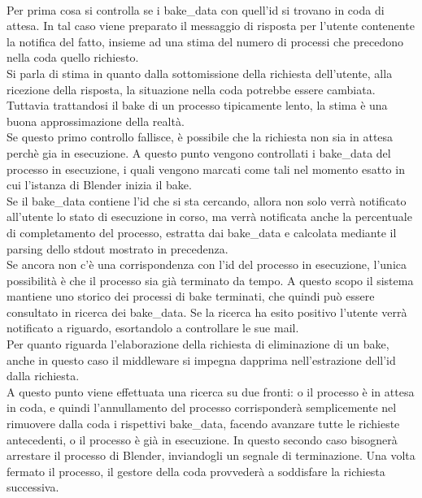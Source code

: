 \\
Per prima cosa si controlla se i bake\_data con quell’id si trovano in coda di attesa. In tal caso viene preparato il messaggio di risposta per l’utente contenente la notifica del fatto, insieme ad una stima del numero di processi che precedono nella coda quello richiesto. 
\\
Si parla di stima in quanto dalla sottomissione della richiesta dell’utente, alla ricezione della risposta, la situazione nella coda potrebbe essere cambiata. Tuttavia trattandosi il bake di un processo tipicamente lento, la stima è una buona approssimazione della realtà. 
\\
Se questo primo controllo fallisce, è possibile che la richiesta non sia in attesa perchè gia in esecuzione. A questo punto vengono controllati i bake\_data del processo in esecuzione, i quali vengono marcati come tali nel momento esatto in cui l’istanza di Blender inizia il bake.
\\ 
Se il bake\_data contiene l’id che si sta cercando, allora non solo verrà notificato all’utente lo stato di esecuzione in corso, ma verrà notificata anche la percentuale di completamento del processo, estratta dai bake\_data e calcolata mediante il parsing dello stdout mostrato in precedenza.
\\ 
Se ancora non c’è una corrispondenza con l’id del processo in esecuzione, l’unica possibilità è che il processo sia già terminato da tempo. A questo scopo il sistema mantiene uno storico dei processi di bake terminati, che quindi può essere consultato in ricerca dei bake\_data. Se la ricerca ha esito positivo l’utente verrà notificato a riguardo, esortandolo a controllare le sue mail. 
\\
Per quanto riguarda l’elaborazione della richiesta di eliminazione di un bake, anche in questo caso il middleware si impegna dapprima nell’estrazione dell’id dalla richiesta. 
\\
A questo punto viene effettuata una ricerca su due fronti: o il processo è in attesa in coda, e quindi l’annullamento del processo corrisponderà semplicemente nel rimuovere dalla coda i rispettivi bake\_data, facendo avanzare tutte le richieste antecedenti, o il processo è già in esecuzione. In questo secondo caso bisognerà arrestare il processo di Blender, inviandogli un segnale di terminazione. 
Una volta fermato il processo, il gestore della coda provvederà a soddisfare la richiesta successiva.    
